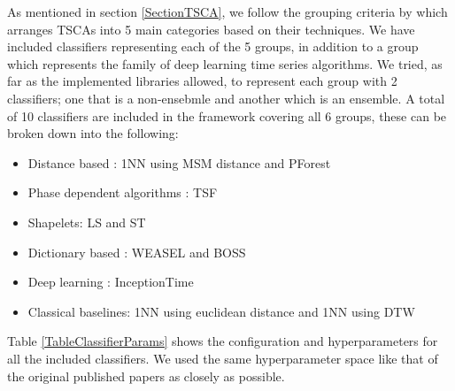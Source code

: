 As mentioned in section \ref{SectionTSCA}, we follow the grouping criteria by \cite{bagnall2017great} which arranges TSCAs into 5 main categories based on their techniques.
We have included classifiers representing each of the 5 groups, in addition to a  group which represents the family of deep learning time series algorithms.
We tried, as far as the implemented libraries allowed, to represent each group with 2 classifiers; one that is a non-ensebmle and another which is an ensemble.
A total of 10 classifiers are included in the framework covering all 6 groups, these can be broken down into the following:
\begin{itemize}
  \item Distance based : 1NN using MSM distance and PForest
  \item Phase dependent algorithms : TSF
  \item Shapelets: LS and ST
  \item Dictionary based : WEASEL and BOSS
  \item Deep learning : InceptionTime
  \item Classical baselines: 1NN using euclidean distance and 1NN using DTW
\end{itemize}

Table \ref{TableClassifierParams} shows the configuration and hyperparameters for all the included classifiers.
We used the same hyperparameter space like that of the original published papers as closely as possible.

